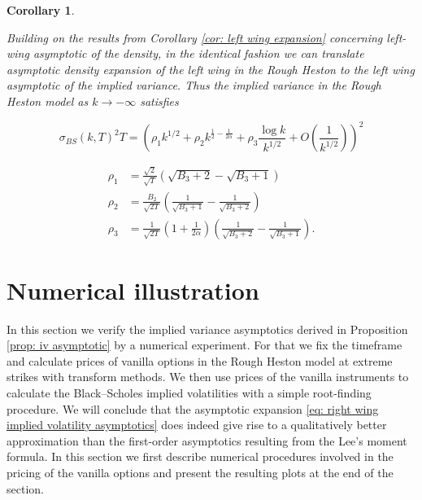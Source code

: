 \documentclass[12pt,twoside]{article}
\theoremstyle{plain}
\theoremstyle{plain}
\newtheorem{corollary}[proposition]{Corollary}
\theoremstyle{definition}
\theoremstyle{remark}
\numberwithin{equation}{section}
\begin{document}
\begin{corollary}
\label{prop: iv asymptotic left wing}

Building on the results from Corollary \ref{cor: left wing expansion} concerning left-wing asymptotic of the density, in the identical fashion we can translate asymptotic density expansion of the left wing in the Rough Heston to the left wing asymptotic of the implied variance. Thus the implied variance in the Rough Heston model as $k\rightarrow -\infty$ satisfies

\begin{equation}
\label{eq: right wing implied volatility asymptotics}
\sigma_{B S}(k, T)^{2} T=\left(\rho_{1} k^{1 / 2}+\rho_{2} k ^{\frac 12 - \frac{1}{2\alpha}} +\rho_{3} \frac{\log k}{k^{1 / 2}}+O\left(\frac{1}{k^{1 / 2}}\right)\right)^{2}
\end{equation}

$$
\begin{aligned}
\rho_{1} &=\frac{\sqrt{2}}{\sqrt{T}}\left(\sqrt{B_{3}+2}-\sqrt{B_{3}+1}\right) \\[5pt]
\rho_{2} &=\frac{B_{2}}{\sqrt{2 T}}\left(\frac{1}{\sqrt{B_{3}+1}}-\frac{1}{\sqrt{B_{3}+2}}\right) \\[5pt]
\rho_{3}&=\frac{1}{\sqrt{2 T}}\left(1 + \frac{1}{2\alpha}\right)\left(\frac{1}{\sqrt{B_{3}+2}}-\frac{1}{\sqrt{B_{3}+1}}\right).
\end{aligned}
$$

\end{corollary}

\section{Numerical illustration}
\label{sec: numerical illustration}

In this section we verify the implied variance asymptotics derived in Proposition \ref{prop: iv asymptotic} by a numerical experiment. For that we fix the timeframe and calculate prices of vanilla options in the Rough Heston model at extreme strikes with transform methods. We then use prices of the vanilla instruments to calculate the Black–Scholes implied volatilities with a simple root-finding procedure. We will conclude that the asymptotic expansion \eqref{eq: right wing implied volatility asymptotics} does indeed give rise to a qualitatively better approximation than the first-order asymptotics resulting from the Lee's moment formula.
In this section we first describe numerical procedures involved in the pricing of the vanilla options and present the resulting plots at the end of the section.
\end{document}
